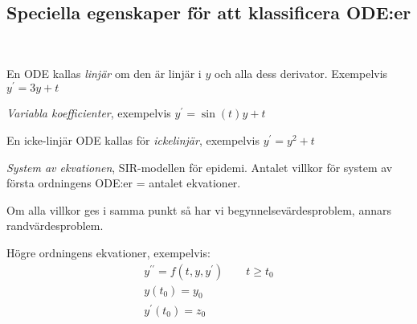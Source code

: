 \subsection{Speciella egenskaper för att klassificera ODE:er}\hfill\\
\par\bigskip
\noindent En ODE kallas \textit{linjär }om den är linjär i $y$ och alla dess derivator. Exempelvis $y^{\prime} = 3y+t$
\par\bigskip
\noindent \textit{Variabla koefficienter}, exempelvis $y^{\prime} = \sin(t)y+t$
\par\bigskip
\noindent En icke-linjär ODE kallas för \textit{ickelinjär}, exempelvis $y^{\prime} = y^2+t$
\par\bigskip
\noindent \textit{System av ekvationen}, SIR-modellen för epidemi. Antalet villkor för system av första ordningens ODE:er = antalet ekvationer.
\par\bigskip
\noindent Om alla villkor ges i samma punkt så har vi begynnelsevärdesproblem, annars randvärdesproblem.
\par\bigskip
\noindent Högre ordningens ekvationer, exempelvis:
\begin{equation*}
  \begin{gathered}
    y^{\prime\prime}=f(t,y,y^{\prime})\qquad t\geq t_0\\
    y(t_0) = y_0\\
    y^{\prime}(t_0) = z_0
  \end{gathered}
\end{equation*}
\par\bigskip
